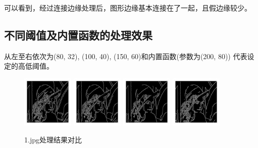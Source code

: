 \documentclass{article}
\begin{document}
    可以看到，经过连接边缘处理后，图形边缘基本连接在了一起，且假边缘较少。

\subsection{不同阈值及内置函数的处理效果}

    从左至右依次为(80, 32), (100, 40), (150, 60)和内置函数(参数为(200, 80))
    代表设定的高低阈值。

\begin{figure}[h]
    \centering
    \includegraphics[width=0.22\textwidth]{./result/1_80_32}
    \includegraphics[width=0.22\textwidth]{./result/1_100_40}
    \includegraphics[width=0.22\textwidth]{./result/1_150_60}
    \includegraphics[width=0.22\textwidth]{./result/1_standard}
    \caption{1.jpg处理结果对比}
\end{figure}
\end{document}
